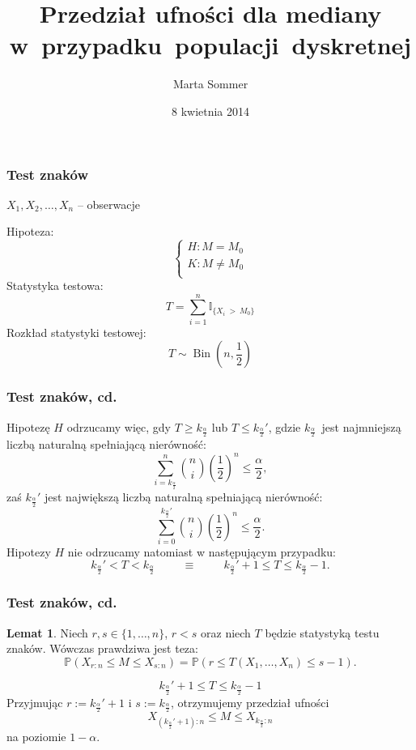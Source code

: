 \documentclass[11pt,usenames,dvipsnames,svgnames,x11names]{beamer}
\date{8 kwietnia 2014}
\author{Marta Sommer}
\title{Przedział ufności dla mediany w~przypadku~populacji~dyskretnej}
\theoremstyle{plain}
\theoremstyle{definition}
\newtheorem{lemat}{Lemat}
\theoremstyle{remark}
\begin{document}
\begin{frame}   %
\titlepage
\end{frame}


\begin{frame}
\frametitle{Test znaków}

\begin{center}
$X_1,X_2,\ldots,X_n$ -- obserwacje
\end{center}

Hipoteza:
$$
\left\{
\begin{array}{l}
H: M=M_0 \\
K: M\neq M_0 \\
\end{array}
\right.
$$
Statystyka testowa:
$$
T = \sum_{i=1}^n \mathbb{I}_{\lbrace X_i~>~M_0\rbrace } 
$$
Rozkład statystyki testowej:
$$
T\sim \operatorname{Bin}(n,\dfrac{1}{2})
$$
\end{frame}

\begin{frame}
\frametitle{Test znaków, cd.}
Hipotezę $H$ odrzucamy więc, gdy $T\geq k_{\frac{\alpha}{2}}$ lub $T\leq k_{\frac{\alpha}{2}}'$, gdzie $k_{\frac{\alpha}{2}}$~jest najmniejszą liczbą naturalną spełniającą nierówność:
$$
\sum_{i=k_{\frac{\alpha}{2}}}^n {n\choose i}\left(\dfrac{1}{2}\right)^n\leq \dfrac{\alpha}{2},
$$ 
zaś $k_{\frac{\alpha}{2}}'$ jest największą liczbą naturalną spełniającą nierówność:
$$
\sum^{k_{\frac{\alpha}{2}}'}_{i=0} {n\choose i}\left(\dfrac{1}{2}\right)^n\leq \dfrac{\alpha}{2}.
$$
Hipotezy $H$ nie odrzucamy natomiast w następującym przypadku:
$$
k_{\frac{\alpha}{2}}'<T<k_{\frac{\alpha}{2}}\hspace{1cm} \equiv \hspace{1cm} k_{\frac{\alpha}{2}}'+1 \leq T \leq k_{\frac{\alpha}{2}}-1.
$$
\end{frame}
 
\begin{frame}
\frametitle{Test znaków, cd.}
\begin{lemat}
Niech $r,s\in \{ 1,\ldots,n \}$, $r<s$ oraz niech $T$ będzie statystyką testu znaków. Wówczas prawdziwa jest teza:
$$
\mathbb{P}(X_{r:n}\leq M \leq X_{s:n}) = \mathbb{P}(r\leq T(X_1,\ldots,X_n)\leq s-1).
$$
\end{lemat}

$$
k_{\frac{\alpha}{2}}'+1 \leq T \leq k_{\frac{\alpha}{2}}-1
$$
Przyjmując $r:=k_{\frac{\alpha}{2}}'+1$ i $s:=k_{\frac{\alpha}{2}}$, otrzymujemy przedział ufności
$$
X_{(k_{\frac{\alpha}{2}}'+1):n}\leq M \leq X_{k_{\frac{\alpha}{2}}:n}
$$
na poziomie $1-\alpha$. 
\end{frame}
\end{document}
